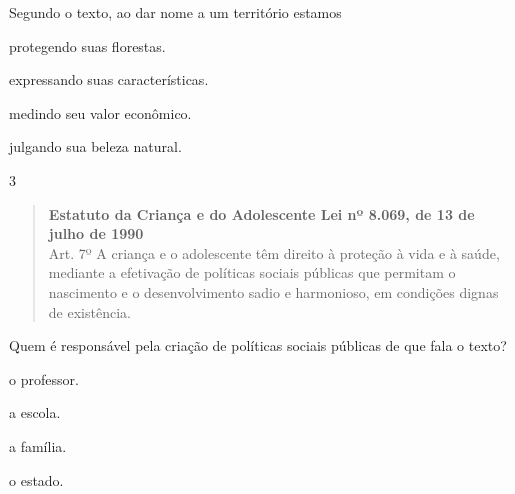 Segundo o texto, ao dar nome a um território estamos

\begin{minipage}{0.5\textwidth}
\begin{escolha}
\item protegendo suas florestas.

\item expressando suas características.

\item medindo seu valor econômico.

\item julgando sua beleza natural.
\end{escolha}
\end{minipage}


\num{3}

\begin{quote}
\textbf{Estatuto da Criança e do Adolescente Lei nº 8.069, de 13 de julho de 1990}\\
Art. 7º A criança e o adolescente têm direito à proteção à vida e à
saúde, mediante a efetivação de políticas sociais públicas que permitam
o nascimento e o desenvolvimento sadio e harmonioso, em condições dignas
de existência.

\end{quote}

Quem é responsável pela criação de políticas sociais públicas de que
fala o texto?

\begin{minipage}{0.5\textwidth}
\begin{escolha}
\item o professor.

\item a escola.

\item a família.

\item o estado.
\end{escolha}
\end{minipage}

